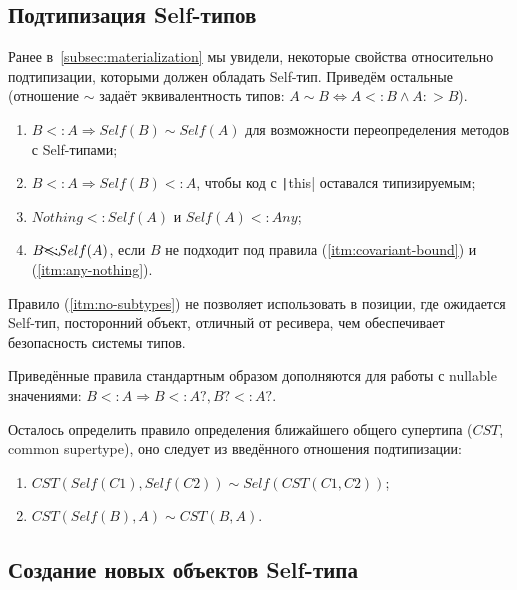 

\subsection{Подтипизация Self-типов} \label{subsec:self-subtyping}

Ранее в~\ref{subsec:materialization} мы увидели, некоторые свойства относительно подтипизации, которыми должен обладать Self-тип.
Приведём остальные (отношение $\sim$ задаёт эквивалентность типов: $A \sim B \iff A <: B \land A :> B$).

\begin{enumerate}
    \item \label{itm:covariant-bound} $B <: A \Rightarrow Self(B) \sim Self(A)$ для возможности переопределения методов с Self-типами;
    \item \label{itm:this-subtype} $B <: A \Rightarrow Self(B) <: A$, чтобы код с \texttt|this| оставался типизируемым;
    \item \label{itm:any-nothing} $Nothing <: Self(A)$ и $Self(A) <: Any$;
    \item \label{itm:no-subtypes} $B \bcancel{<:} Self(A)$, если $B$ не подходит под правила (\ref{itm:covariant-bound}) и (\ref{itm:any-nothing}).
\end{enumerate}

Правило (\ref{itm:no-subtypes}) не позволяет использовать в позиции, где ожидается Self-тип, посторонний объект, отличный от ресивера, чем обеспечивает безопасность системы типов.

Приведённые правила стандартным образом дополняются для работы с nullable значениями:
$B <: A \Rightarrow B <: A?, B? <: A?$.

Осталось определить правило определения ближайшего общего супертипа ($CST$, common supertype), оно следует из введённого отношения подтипизации:
\begin{enumerate}
    \item $CST(Self(C1), Self(C2)) \sim Self(CST(C1, C2))$;
    \item $CST(Self(B), A) \sim CST(B, A)$.
\end{enumerate}


\subsection{Создание новых объектов Self-типа}

